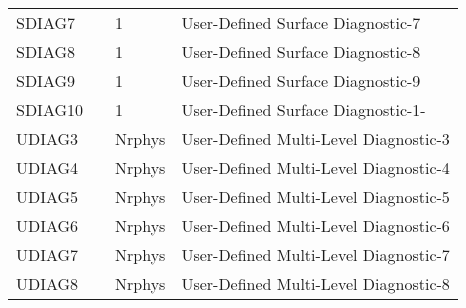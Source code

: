 \begin{tabular}{llll}
 SDIAG7   &             &    1  
         &\begin{minipage}[t]{3in}
          {User-Defined Surface Diagnostic-7} 
         \end{minipage}\\
 SDIAG8   &             &    1  
         &\begin{minipage}[t]{3in}
          {User-Defined Surface Diagnostic-8} 
         \end{minipage}\\
 SDIAG9   &             &    1  
         &\begin{minipage}[t]{3in}
          {User-Defined Surface Diagnostic-9} 
         \end{minipage}\\
 SDIAG10  &             &    1  
         &\begin{minipage}[t]{3in}
          {User-Defined Surface Diagnostic-1-} 
         \end{minipage}\\
 UDIAG3   &             &    Nrphys  
         &\begin{minipage}[t]{3in}
          {User-Defined Multi-Level Diagnostic-3} 
         \end{minipage}\\
 UDIAG4   &             &    Nrphys  
         &\begin{minipage}[t]{3in}
          {User-Defined Multi-Level Diagnostic-4} 
         \end{minipage}\\
 UDIAG5   &             &    Nrphys  
         &\begin{minipage}[t]{3in}
          {User-Defined Multi-Level Diagnostic-5} 
         \end{minipage}\\
 UDIAG6   &             &    Nrphys  
         &\begin{minipage}[t]{3in}
          {User-Defined Multi-Level Diagnostic-6} 
         \end{minipage}\\
 UDIAG7   &             &    Nrphys  
         &\begin{minipage}[t]{3in}
          {User-Defined Multi-Level Diagnostic-7} 
         \end{minipage}\\
 UDIAG8   &             &    Nrphys  
         &\begin{minipage}[t]{3in}
          {User-Defined Multi-Level Diagnostic-8} 
         \end{minipage}\\

\end{tabular}

